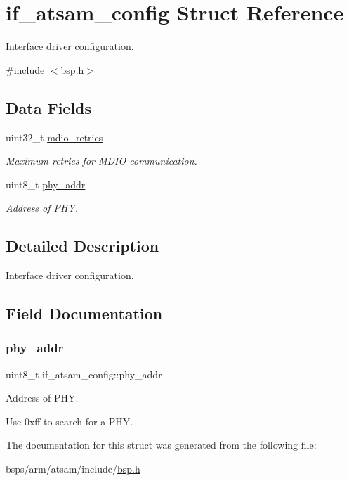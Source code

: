 \hypertarget{structif__atsam__config}{}\section{if\+\_\+atsam\+\_\+config Struct Reference}
\label{structif__atsam__config}


Interface driver configuration.  




{\ttfamily \#include $<$bsp.\+h$>$}

\subsection*{Data Fields}
\begin{DoxyCompactItemize}
\item 
\mbox{\label{structif__atsam__config_af4e52f132d10b2959911f58c6e7b4a7b}} 
uint32\+\_\+t \mbox{\hyperlink{structif__atsam__config_af4e52f132d10b2959911f58c6e7b4a7b}{mdio\+\_\+retries}}
\begin{DoxyCompactList}\small\item\em Maximum retries for M\+D\+IO communication. \end{DoxyCompactList}\item 
uint8\+\_\+t \mbox{\hyperlink{structif__atsam__config_a12a939dd26920fdaf8626189572481a2}{phy\+\_\+addr}}
\begin{DoxyCompactList}\small\item\em Address of P\+HY. \end{DoxyCompactList}\end{DoxyCompactItemize}


\subsection{Detailed Description}
Interface driver configuration. 

\subsection{Field Documentation}
\mbox{\label{structif__atsam__config_a12a939dd26920fdaf8626189572481a2}} 
\subsubsection{\texorpdfstring{phy\_addr}{phy\_addr}}
{\footnotesize\ttfamily uint8\+\_\+t if\+\_\+atsam\+\_\+config\+::phy\+\_\+addr}



Address of P\+HY. 

Use 0xff to search for a P\+HY. 

The documentation for this struct was generated from the following file\+:\begin{DoxyCompactItemize}
\item 
bsps/arm/atsam/include/\mbox{\hyperlink{bsps_2arm_2atsam_2include_2bsp_8h}{bsp.\+h}}\end{DoxyCompactItemize}
